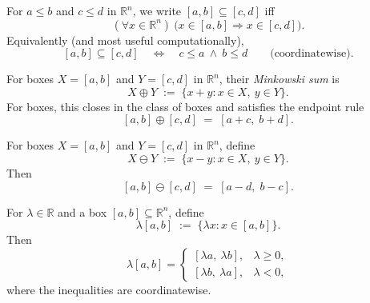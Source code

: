 \begin{tcolorbox}[colback=propbox, colframe=propborder, arc=2pt,
  left=6pt, right=6pt, top=4pt, bottom=4pt,
  title={\small\textbf{Definition (Box Containment)}},
  fonttitle=\small\bfseries]
\label{def:box-contain}
For $a\le b$ and $c\le d$ in $\mathbb{R}^n$, we write $[a,b]\subseteq[c,d]$ iff
\[
(\forall x\in\mathbb{R}^n)\ \bigl(x\in[a,b]\Rightarrow x\in[c,d]\bigr).
\]
Equivalently (and most useful computationally),
\[
[a,b]\subseteq[c,d]\quad \Longleftrightarrow\quad c\le a\ \land\ b\le d
\qquad\text{(coordinatewise).}
\]
\end{tcolorbox}

\begin{tcolorbox}[colback=propbox, colframe=propborder, arc=2pt,
  left=6pt, right=6pt, top=4pt, bottom=4pt,
  title={\small\textbf{Definition (Minkowski Addition of Boxes)}},
  fonttitle=\small\bfseries]
\label{def:box-add}
For boxes $X=[a,b]$ and $Y=[c,d]$ in $\mathbb{R}^n$, their \emph{Minkowski sum} is
\[
X\oplus Y \;:=\; \{x+y : x\in X,\ y\in Y\}.
\]
For boxes, this closes in the class of boxes and satisfies the endpoint rule
\[
[a,b]\oplus[c,d] \;=\; [a+c,\; b+d].
\]
\end{tcolorbox}

\begin{tcolorbox}[colback=propbox, colframe=propborder, arc=2pt,
  left=6pt, right=6pt, top=4pt, bottom=4pt,
  title={\small\textbf{Definition (Box Subtraction / Difference)}},
  fonttitle=\small\bfseries]
\label{def:box-sub}
For boxes $X=[a,b]$ and $Y=[c,d]$ in $\mathbb{R}^n$, define
\[
X\ominus Y \;:=\; \{x-y : x\in X,\ y\in Y\}.
\]
Then
\[
[a,b]\ominus[c,d] \;=\; [a-d,\; b-c].
\]
\end{tcolorbox}

\begin{tcolorbox}[colback=propbox, colframe=propborder, arc=2pt,
  left=6pt, right=6pt, top=4pt, bottom=4pt,
  title={\small\textbf{Definition (Scalar Multiplication of a Box)}},
  fonttitle=\small\bfseries]
\label{def:box-smul}
For $\lambda\in\mathbb{R}$ and a box $[a,b]\subseteq\mathbb{R}^n$, define
\[
\lambda[a,b] \;:=\; \{\lambda x : x\in[a,b]\}.
\]
Then
\[
\lambda[a,b]=
\begin{cases}
[\lambda a,\ \lambda b], & \lambda\ge 0,\\[4pt]
[\lambda b,\ \lambda a], & \lambda<0,
\end{cases}
\]
where the inequalities are coordinatewise.
\end{tcolorbox}

